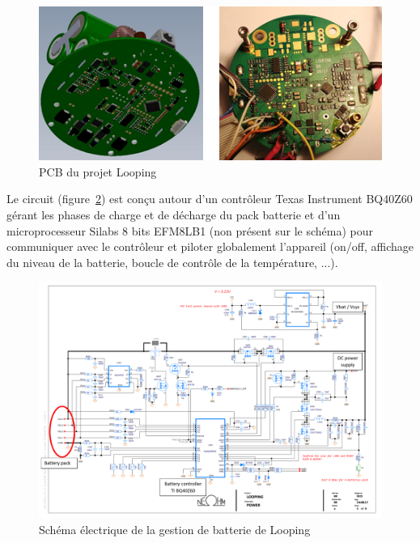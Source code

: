\documentclass[a4paper, 12pt, sffamily]{report}
\begin{document}
\begin{figure}[H]
\centering
\includegraphics[scale=1]{figures/photos/looping_pcb.jpg}
\caption{PCB du projet Looping}
\label{fig:looping_pcb}
\end{figure}

Le circuit (figure~\ref{fig:looping_charger}) est conçu autour d'un contrôleur Texas Instrument BQ40Z60 gérant les phases de charge et de décharge du pack batterie et d'un microprocesseur Silabs 8 bits EFM8LB1 (non présent sur le schéma) pour communiquer avec le contrôleur et piloter globalement l'appareil (on/off, affichage du niveau de la batterie, boucle de contrôle de la température, ...).

\begin{figure}[h]
\centering
\includegraphics[scale=0.6]{figures/screenshots/battery_charger.png}
\caption{Schéma électrique de la gestion de batterie de Looping}
\label{fig:looping_charger}
\end{figure}
\end{document}
